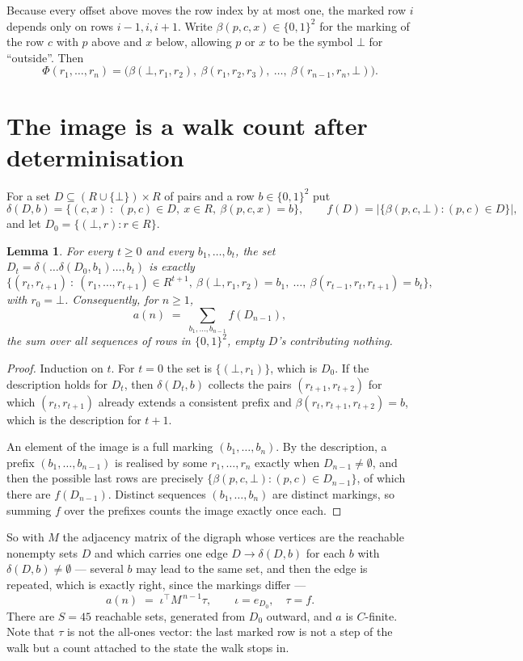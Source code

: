 \documentclass[11pt,a4paper]{article}
\theoremstyle{plain}
\newtheorem{lemma}[theorem]{Lemma}
\theoremstyle{definition}
\begin{document}
Because every offset above moves the row index by at most one, the marked row $i$ depends only
on rows $i-1,i,i+1$. Write $\beta(p,c,x)\in\{0,1\}^{2}$ for the marking of the row $c$
with $p$ above and $x$ below, allowing $p$ or $x$ to be the symbol $\bot$ for ``outside''.
Then
\[
\Phi(r_1,\dots,r_n)=\bigl(\beta(\bot,r_1,r_2),\ \beta(r_1,r_2,r_3),\ \dots,\
\beta(r_{n-1},r_n,\bot)\bigr).
\]

\section{The image is a walk count after determinisation}

For a set $D\subseteq(R\cup\{\bot\})\times R$ of pairs and a row $b\in\{0,1\}^{2}$ put
\[
\delta(D,b)=\{(c,x)\ :\ (p,c)\in D,\ x\in R,\ \beta(p,c,x)=b\},\qquad
f(D)=\bigl|\{\beta(p,c,\bot):(p,c)\in D\}\bigr| ,
\]
and let $D_0=\{(\bot,r):r\in R\}$.

\begin{lemma}\label{lem:det}
For every $t\ge0$ and every $b_1,\dots,b_t$, the set
$D_t=\delta(\dots\delta(D_0,b_1)\dots,b_t)$ is exactly
\[
\{(r_t,r_{t+1})\ :\ (r_1,\dots,r_{t+1})\in R^{t+1},\ \beta(\bot,r_1,r_2)=b_1,\ \dots,\
\beta(r_{t-1},r_t,r_{t+1})=b_t\} ,
\]
with $r_0=\bot$. Consequently, for $n\ge1$,
\[
a(n)\;=\;\sum_{b_1,\dots,b_{n-1}}f(D_{n-1}),
\]
the sum over all sequences of rows in $\{0,1\}^{2}$, empty $D$'s contributing nothing.
\end{lemma}

\begin{proof}
Induction on $t$. For $t=0$ the set is $\{(\bot,r_1)\}$, which is $D_0$. If the description
holds for $D_t$, then $\delta(D_t,b)$ collects the pairs $(r_{t+1},r_{t+2})$ for which
$(r_t,r_{t+1})$ already extends a consistent prefix and
$\beta(r_t,r_{t+1},r_{t+2})=b$, which is the description for $t+1$.

An element of the image is a full marking $(b_1,\dots,b_n)$. By the description, a prefix
$(b_1,\dots,b_{n-1})$ is realised by some $r_1,\dots,r_n$ exactly when $D_{n-1}\neq
\emptyset$, and then the possible last rows are precisely
$\{\beta(p,c,\bot):(p,c)\in D_{n-1}\}$, of which there are $f(D_{n-1})$. Distinct
sequences $(b_1,\dots,b_n)$ are distinct markings, so summing $f$ over the prefixes counts the
image exactly once each.
\end{proof}

So with $M$ the adjacency matrix of the digraph whose vertices are the reachable nonempty sets
$D$ and which carries one edge $D\to\delta(D,b)$ for each $b$ with $\delta(D,b)\neq\emptyset$
--- several $b$ may lead to the same set, and then the edge is repeated, which is exactly
right, since the markings differ ---
\[
a(n)\;=\;\iota^{\!\top}M^{\,n-1}\tau,\qquad \iota=e_{D_0},\quad \tau=f .
\]
There are $S=45$ reachable sets, generated from $D_0$ outward, and $a$ is $C$-finite. Note
that $\tau$ is not the all-ones vector: the last marked row is not a step of the walk but a
count attached to the state the walk stops in.
\end{document}
